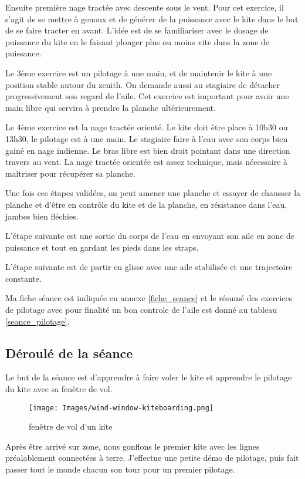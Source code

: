 \documentclass[11pt,a4paper]{report}
\begin{document}
Ensuite première nage tractée avec descente sous 
le vent. Pour cet exercice, il s'agit de se mettre à genoux
et de générer de la puissance avec le kite dans le but
de se faire tracter en avant.  L'idée est de se familiariser
avec le dosage de puissance du kite en le faisant plonger
plus ou moins vite dans la zone de puissance.

Le 3ème exercice est un pilotage à une main, et 
de maintenir le kite à une position stable autour
du zenith. On demande aussi au stagiaire de
détacher progressivement son regard de l'aile.
Cet exercice est important pour avoir une main libre
qui servira à prendre la planche ultérieurement.

Le 4ème exercice est la nage tractée orienté.
Le kite doit être place à 10h30 ou 13h30, le pilotage
est à une main. Le stagiaire faire  à l'eau
avec son corps bien gainé en nage indienne. Le bras
libre est bien droit pointant dans une direction 
travers au vent. La nage tractée orientée est assez
technique, mais nécessaire à maîtriser pour récupérer 
sa planche.

Une fois ces étapes validées, on peut
amener une planche et essayer de chausser la planche
et d’être en contrôle du kite et de la planche, 
en résistance dans l'eau, jambes bien fléchies.

L'étape suivante est une sortie du corps de l'eau
en envoyant son aile en zone de puissance et tout en 
gardant les pieds dans les straps. 

L'étape suivante est de partir en glisse avec
une aile stabilisée et une trajectoire constante.

Ma fiche séance est indiquée en annexe \ref{fiche_seance}
et le résumé des exercices de pilotage avec pour
finalité un bon controle de l'aile est donné
au tableau \ref{seance_pilotage}.

\subsection{Déroulé de la séance}
Le but de la séance est d'apprendre à faire voler le kite et
apprendre le pilotage du kite avec sa fen\^etre de vol.
\begin{figure}
\centering
\texttt{[image: Images/wind-window-kiteboarding.png]}
\caption{fen\^etre de vol d'un kite\label{fenetre}}
\end{figure} 

Après \^etre arrivé sur zone, nous gonflons le premier kite avec les
lignes préalablement connectées à terre. J'effectue une petite démo
de pilotage, puis fait passer tout le monde chacun son tour pour
un premier pilotage.
\end{document}
